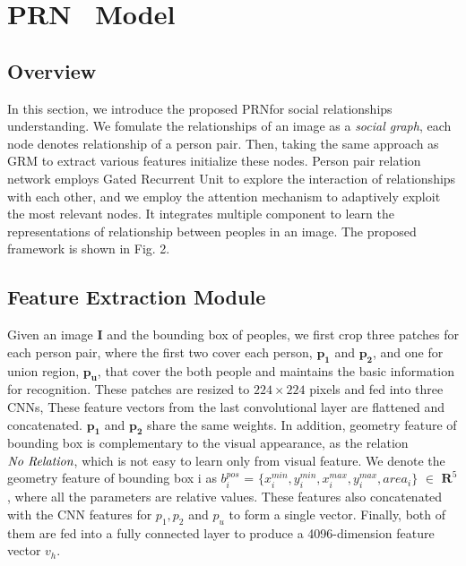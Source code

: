 \documentclass{article}
\newcommand{\PRN}{{\sf PRN}}
\begin{document}
\section{PRN \ Model}

\subsection{Overview} \label{section:ov}
In this section, we introduce the proposed \PRN for social relationships understanding. We fomulate the relationships of an image as a \emph{social graph}, each node denotes relationship of a person pair. Then, taking the same approach as GRM\cite{DBLP:conf/ijcai/WangCRYCL18} to extract various features initialize these nodes. Person pair relation  network employs Gated Recurrent Unit\cite{DBLP:conf/ssst/ChoMBB14} to explore the interaction of relationships with each other, and we employ the attention mechanism to adaptively exploit the most relevant nodes. It integrates multiple
component to learn the representations of relationship between peoples in an image. 
 The proposed framework is shown in Fig. 2.

\subsection{Feature Extraction Module} \label{section:vs}

Given an image \textbf{I} and the bounding box of peoples, we first crop three patches for each person pair, where the first two cover each person, $\mathbf{p_1}$ and $\mathbf{p_2}$, and one for union region, $\mathbf{p_u}$, that cover the both people and maintains the basic information for recognition. These patches are resized to $224\times224$ pixels and fed into three CNNs, These feature vectors from the last convolutional layer are flattened and concatenated. $\mathbf{p_1}$ and $\mathbf{p_2}$ share the same weights.
In addition, geometry feature of bounding box is complementary to the visual appearance, as the relation $\emph{No Relation}$, which is not easy to learn only from visual feature. We denote the geometry feature of bounding box i as $b_i^{pos}$ = $\{x_i^{min}, y_i^{min},x_i^{max},y_i^{max},area_i\}$  $\in$ $\mathbf{R}^5$, where all the parameters are relative values. These features also concatenated with the CNN features for $p_1,p_2$ and $p_u$ to form a single vector. Finally, both of them are fed into a fully connected layer to produce a 4096-dimension feature vector $v_h$. 
\end{document}
